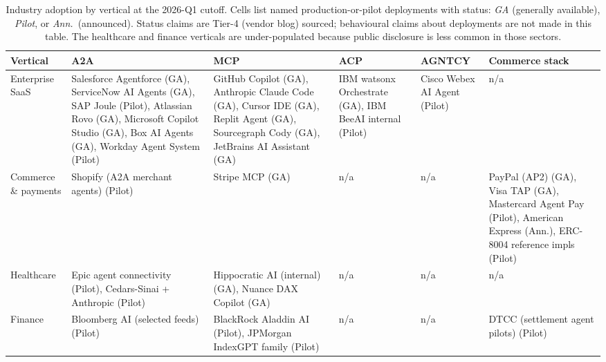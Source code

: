 
\begin{table}[t]
  \centering
  \caption{Industry adoption by vertical at the 2026-Q1 cutoff. Cells list named production-or-pilot deployments with status: \textit{GA} (generally available), \textit{Pilot}, or \textit{Ann.}\ (announced). Status claims are Tier-4 (vendor blog) sourced; behavioural claims about deployments are not made in this table. The healthcare and finance verticals are under-populated because public disclosure is less common in those sectors.}
  \label{tab:industry-adoption}
  \footnotesize
  \begin{tabular}{p{2.3cm}p{2.6cm}p{2.6cm}p{2.6cm}p{2.6cm}p{2.6cm}}
    \toprule
    Vertical & A2A & MCP & ACP & AGNTCY & Commerce stack \\
    \midrule
    Enterprise SaaS & \scriptsize Salesforce Agentforce (GA), \linebreak ServiceNow AI Agents (GA), \linebreak SAP Joule (Pilot), \linebreak Atlassian Rovo (GA), \linebreak Microsoft Copilot Studio (GA), \linebreak Box AI Agents (GA), \linebreak Workday Agent System (Pilot) & \scriptsize GitHub Copilot (GA), \linebreak Anthropic Claude Code (GA), \linebreak Cursor IDE (GA), \linebreak Replit Agent (GA), \linebreak Sourcegraph Cody (GA), \linebreak JetBrains AI Assistant (GA) & \scriptsize IBM watsonx Orchestrate (GA), \linebreak IBM BeeAI internal (Pilot) & \scriptsize Cisco Webex AI Agent (Pilot) & n/a \\[6pt]
    Commerce \& payments & \scriptsize Shopify (A2A merchant agents) (Pilot) & \scriptsize Stripe MCP (GA) & n/a & n/a & \scriptsize PayPal (AP2) (GA), \linebreak Visa TAP (GA), \linebreak Mastercard Agent Pay (Pilot), \linebreak American Express (Ann.), \linebreak ERC-8004 reference impls (Pilot) \\[6pt]
    Healthcare & \scriptsize Epic agent connectivity (Pilot), \linebreak Cedars-Sinai + Anthropic (Pilot) & \scriptsize Hippocratic AI (internal) (GA), \linebreak Nuance DAX Copilot (GA) & n/a & n/a & n/a \\[6pt]
    Finance & \scriptsize Bloomberg AI (selected feeds) (Pilot) & \scriptsize BlackRock Aladdin AI (Pilot), \linebreak JPMorgan IndexGPT family (Pilot) & n/a & n/a & \scriptsize DTCC (settlement agent pilots) (Pilot) \\[6pt]
    \bottomrule
  \end{tabular}
\end{table}
